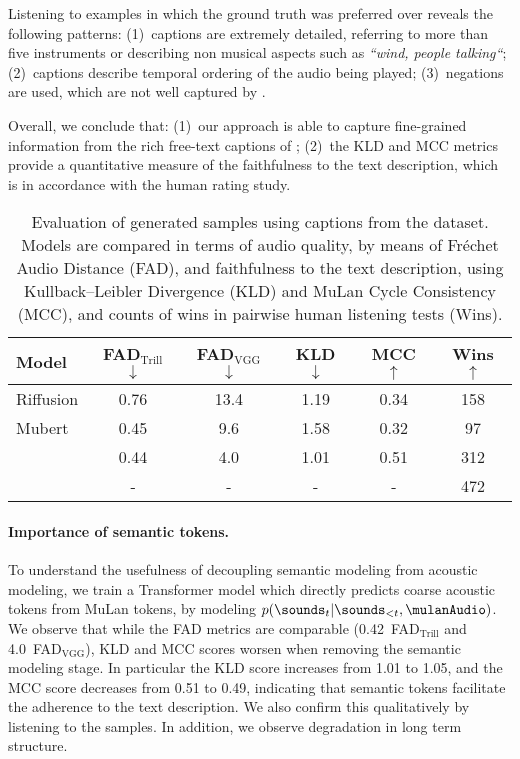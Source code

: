 Listening to examples in which the ground truth was preferred over \model{} reveals the following patterns:
(1)~captions are extremely detailed, referring to more than five instruments or describing non musical aspects such as \textit{``wind, people talking``}; (2)~captions describe temporal ordering of the audio being played; (3)~negations are used, which are not well captured by \mulan.

Overall, we conclude that: (1)~our approach is able to capture fine-grained information from the rich free-text captions of \dataset{}; (2)~the KLD and MCC metrics provide a quantitative measure of the faithfulness to the text description, which is in accordance with the human rating study.

\begin{table}
\setlength{\tabcolsep}{4pt}
\caption{Evaluation of generated samples using captions from the {\dataset} dataset. Models are compared in terms of audio quality, by means of Fréchet Audio Distance (FAD), and faithfulness to the text description, using Kullback–Leibler Divergence (KLD) and  MuLan Cycle Consistency (MCC), and counts of wins in pairwise human listening tests (Wins).}
\label{table:quant-eval}
\vskip 0.15in
\begin{center}
\scriptsize
\begin{sc}
\begin{tabular}{lccccc}
\toprule
Model & FAD$_{\text{Trill}}$ $\downarrow$ & FAD$_{\text{VGG}}$ $\downarrow$ & KLD $\downarrow$ & MCC $\uparrow$ & Wins $\uparrow$ \\
\midrule

Riffusion & 0.76 & 13.4 & 1.19 & 0.34 & 158 \\
Mubert & 0.45 & 9.6 & 1.58 & 0.32 & 97 \\
\model{} & 0.44 & 4.0 & 1.01 & 0.51 & 312 \\
\midrule
\datasetshort{} & - & - & - & - & 472 \\
\bottomrule
\end{tabular}
\end{sc}
\end{center}
\vskip -0.1in
\end{table}



\paragraph{Importance of semantic tokens.}
\label{results/semantic-tokens}
To understand the usefulness of decoupling semantic modeling from acoustic modeling, we train a Transformer model which directly predicts coarse acoustic tokens from MuLan tokens, by modeling $p(\sounds_t\vert{\sounds_{<t}},\mulanAudio)$.
We observe that while the FAD metrics are comparable (0.42~FAD$_{\text{Trill}}$ and 4.0~FAD$_{\text{VGG}}$), KLD and MCC scores worsen when removing the semantic modeling stage. In particular the KLD score increases from 1.01 to 1.05, and the MCC score decreases from 0.51 to 0.49, indicating that semantic tokens facilitate the adherence to the text description.
We also confirm this qualitatively by listening to the samples. In addition, we observe degradation in long term structure.



